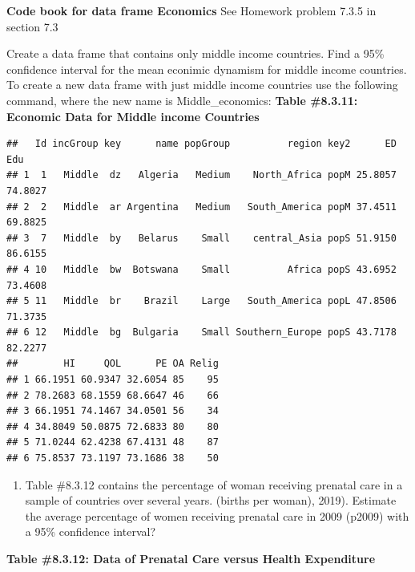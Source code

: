 \documentclass[]{book}
\newenvironment{Shaded}{\begin{snugshade}}{\end{snugshade}}
\newcommand{\KeywordTok}[1]{\textcolor[rgb]{0.13,0.29,0.53}{\textbf{#1}}}
\newcommand{\NormalTok}[1]{#1}
\newcommand{\OperatorTok}[1]{\textcolor[rgb]{0.81,0.36,0.00}{\textbf{#1}}}
\newcommand{\StringTok}[1]{\textcolor[rgb]{0.31,0.60,0.02}{#1}}
\providecommand{\tightlist}{%
  \setlength{\itemsep}{0pt}\setlength{\parskip}{0pt}}
\begin{document}
\textbf{Code book for data frame Economics} See Homework problem 7.3.5 in section 7.3

Create a data frame that contains only middle income countries. Find a 95\% confidence interval for the mean econimic dynamism for middle income countries. To create a new data frame with just middle income countries use the following command, where the new name is Middle\_economics:
\textbf{Table \#8.3.11: Economic Data for Middle income Countries}

\begin{Shaded}
\end{Shaded}

\begin{verbatim}
##   Id incGroup key      name popGroup          region key2      ED     Edu
## 1  1   Middle  dz   Algeria   Medium    North_Africa popM 25.8057 74.8027
## 2  2   Middle  ar Argentina   Medium   South_America popM 37.4511 69.8825
## 3  7   Middle  by   Belarus    Small    central_Asia popS 51.9150 86.6155
## 4 10   Middle  bw  Botswana    Small          Africa popS 43.6952 73.4608
## 5 11   Middle  br    Brazil    Large   South_America popL 47.8506 71.3735
## 6 12   Middle  bg  Bulgaria    Small Southern_Europe popS 43.7178 82.2277
##        HI     QOL      PE OA Relig
## 1 66.1951 60.9347 32.6054 85    95
## 2 78.2683 68.1559 68.6647 46    66
## 3 66.1951 74.1467 34.0501 56    34
## 4 34.8049 50.0875 72.6833 80    80
## 5 71.0244 62.4238 67.4131 48    87
## 6 75.8537 73.1197 73.1686 38    50
\end{verbatim}

\begin{enumerate}
\def\labelenumi{\arabic{enumi}.}
\setcounter{enumi}{5}
\tightlist
\item
  Table \#8.3.12 contains the percentage of woman receiving prenatal care in a sample of countries over several years. (births per woman), 2019). Estimate the average percentage of women receiving prenatal care in 2009 (p2009) with a 95\% confidence interval?
\end{enumerate}

\textbf{Table \#8.3.12: Data of Prenatal Care versus Health Expenditure}
\end{document}
